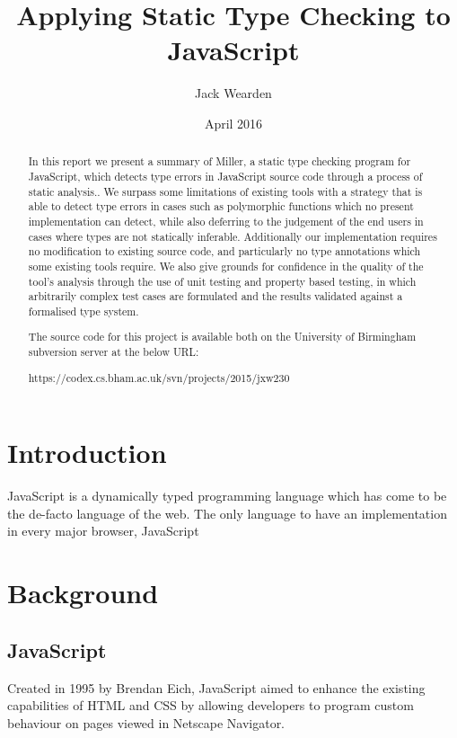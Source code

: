 \documentclass[british, twoside]{bhamthesis}
\title{Applying Static Type Checking to JavaScript}
\author{Jack Wearden}
\date{April 2016}  %
\theoremstyle{definition}
\begin{document}
\maketitle

\begin{abstract}
  In this report we present a summary of Miller, a static type checking program for JavaScript, which detects type errors in JavaScript source code through a process of static analysis.. We surpass some limitations of existing tools with a strategy that is able to detect type errors in cases such as polymorphic functions which no present implementation can detect, while also deferring to the judgement of the end users in cases where types are not statically inferable. Additionally our implementation requires no modification to existing source code, and particularly no type annotations which some existing tools require. We also give grounds for confidence in the quality of the tool's analysis through the use of unit testing and property based testing, in which arbitrarily complex test cases are formulated and the results validated against a formalised type system.

  The source code for this project is available both on the University of Birmingham subversion server at the below URL:

    https://codex.cs.bham.ac.uk/svn/projects/2015/jxw230
\end{abstract}

\tableofcontents

\chapter{Introduction}

  JavaScript is a dynamically typed programming language which has come to be the de-facto language of the web. The only language to have an implementation in every major browser, JavaScript

\chapter{Background}

  \section{JavaScript}
    Created in 1995 by Brendan Eich, JavaScript aimed to enhance the existing capabilities of HTML and CSS by allowing developers to program custom behaviour on pages viewed in Netscape Navigator.
\end{document}
